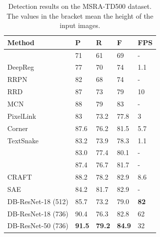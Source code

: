 \documentclass[letterpaper]{article} %
\begin{document}
\begin{table}[ht]
\centering
\caption{Detection results on the MSRA-TD500 dataset. The values in the bracket mean the height of the input images.}
\begin{tabularx}{1.0\linewidth}{@{}l*{4}X@{}}
\toprule
Method        & P             & R             & F             & FPS         \\ \midrule
\cite{he2016text}          & 71            & 61            & 69            & -         \\
DeepReg~\cite{deepdirect}       & 77            & 70            & 74            & 1.1         \\
RRPN~\cite{rrpn}          & 82            & 68            & 74            & -         \\
RRD~\cite{liao2018rotation}           & 87            & 73            & 79            & 10          \\
MCN~\cite{mcn}          & 88            & 79            & 83            & -         \\
PixelLink~\cite{deng2018pixellink}     & 83            & 73.2          & 77.8          & 3           \\
Corner~\cite{lyu2018multi}    & 87.6          & 76.2          & 81.5          & 5.7         \\
TextSnake~\cite{long2018textsnake}     & 83.2          & 73.9          & 78.3          & 1.1         \\
\cite{xue2018accurate}         & 83.0          & 77.4          & 80.1          & -       \\
\cite{MSR}     & 87.4          & 76.7          & 81.7          & -       \\
CRAFT~\cite{craft}         & 88.2          & 78.2          & 82.9          & 8.6       \\
SAE~\cite{tian2019learning}        & 84.2          & 81.7          & 82.9          & -       \\
\midrule
DB-ResNet-18 (512) & 85.7          & 73.2          & 79.0          & \textbf{82} \\
DB-ResNet-18 (736) & 90.4          & 76.3          & 82.8          & 62 \\
DB-ResNet-50 (736) & \textbf{91.5} & \textbf{79.2} & \textbf{84.9} & 32          \\  \bottomrule
\end{tabularx}
\label{tab:td500}
\end{table}
\end{document}
